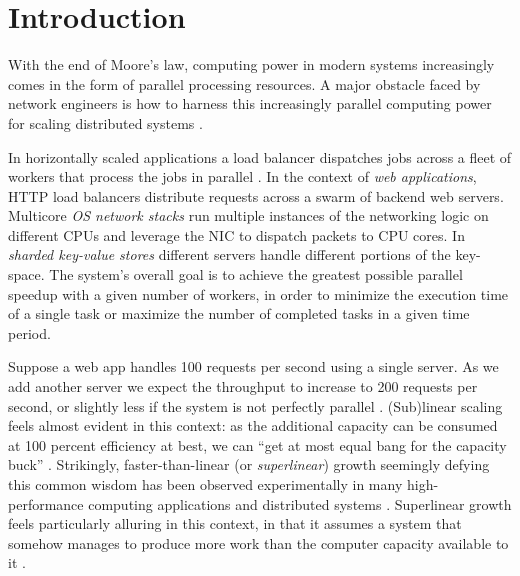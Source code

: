 \section{Introduction}\label{sec:introduction}

With the end of Moore's law, computing power in modern systems increasingly comes in the form of parallel processing resources.  A major obstacle faced by network engineers is how to harness this increasingly parallel computing power for scaling distributed systems \cite{265065, 10.5555/3307441.3307467, 10.1145/2815400.2815423, 10.1145/3098822.3098826, 10.5555/3154630.3154639}.

In horizontally scaled applications a load balancer dispatches jobs across a fleet of workers that process the jobs in parallel \cite{10.5555/3235491}.  In the context of \emph{web applications}, HTTP load balancers \cite{194966, 211279, 9552525} distribute requests across a swarm of backend web servers.  %
Multicore \emph{OS network stacks} \cite{211263, 10.1145/3359989.3365412, 10.1145/3452296.3472914} run multiple instances of the networking logic on different CPUs and leverage the NIC to dispatch packets to CPU cores. %
In \emph{sharded key-value stores} \cite{ghigoff2021bmc} different servers handle different portions of the key-space.  The system's overall goal is to achieve the greatest possible parallel speedup with a given number of workers, in order to minimize the execution time of a single task or maximize the number of completed tasks in a given time period.

Suppose a web app handles 100 requests per second using a single server. As we add another server we expect the throughput to increase to 200 requests per second, or slightly less if the system is not perfectly parallel \cite{10.1145/1465482.1465560}. (Sub)linear scaling feels almost evident in this context: as the additional capacity can be consumed at 100 percent efficiency at best, we can ``get at most equal bang for the capacity buck'' \cite{10.1145/2773212.2789974}. Strikingly, faster-than-linear (or \emph{superlinear}) growth seemingly defying this common wisdom has been observed experimentally in many high-performance computing applications and distributed systems \cite{scalability-analyzed, 10.5555/1012889.1012894, 271208, icsoft20, sdn-analytitcs, 556383, 6483679, 10.1007/978-3-319-77610-1, dobb-1, dobb-2, 10.1145/3627703.3629574, 7733347, 80148}.  Superlinear growth feels particularly alluring in this context, in that it assumes a system that somehow manages to produce more work than the computer capacity available to it \cite{10.1145/2773212.2789974}.

